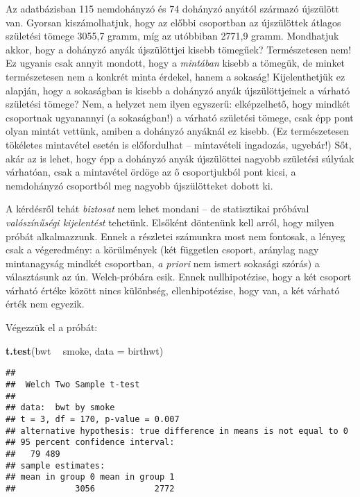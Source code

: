 \documentclass[]{book}
\newenvironment{Shaded}{\begin{snugshade}}{\end{snugshade}}
\newcommand{\DataTypeTok}[1]{\textcolor[rgb]{0.13,0.29,0.53}{#1}}
\newcommand{\KeywordTok}[1]{\textcolor[rgb]{0.13,0.29,0.53}{\textbf{#1}}}
\newcommand{\NormalTok}[1]{#1}
\newcommand{\OperatorTok}[1]{\textcolor[rgb]{0.81,0.36,0.00}{\textbf{#1}}}
\newcommand{\StringTok}[1]{\textcolor[rgb]{0.31,0.60,0.02}{#1}}
\begin{document}
Az adatbázisban 115 nemdohányzó és 74 dohányzó anyától származó újszülött van. Gyorsan kiszámolhatjuk, hogy az előbbi csoportban az újszülöttek átlagos születési tömege 3055,7 gramm, míg az utóbbiban 2771,9 gramm. Mondhatjuk akkor, hogy a dohányzó anyák újszülöttjei kisebb tömegűek? Természetesen nem! Ez ugyanis csak annyit mondott, hogy a \emph{mintában} kisebb a tömegük, de minket természetesen nem a konkrét minta érdekel, hanem a sokaság! Kijelenthetjük ez alapján, hogy a sokaságban is kisebb a dohányzó anyák újszülöttjeinek a várható születési tömege? Nem, a helyzet nem ilyen egyszerű: elképzelhető, hogy mindkét csoportnak ugyanannyi (a sokaságban!) a várható születési tömege, csak épp pont olyan mintát vettünk, amiben a dohányzó anyáknál ez kisebb. (Ez természetesen tökéletes mintavétel esetén is előfordulhat -- mintavételi ingadozás, ugyebár!) Sőt, akár az is lehet, hogy épp a dohányzó anyák újszülöttei nagyobb születési súlyúak várhatóan, csak a mintavétel ördöge az ő csoportjukból pont kicsi, a nemdohányzó csoportból meg nagyobb újszülötteket dobott ki.

A kérdésről tehát \emph{biztosat} nem lehet mondani -- de statisztikai próbával \emph{valószínűségi kijelentést} tehetünk. Elsőként döntenünk kell arról, hogy milyen próbát alkalmazzunk. Ennek a részletei számunkra most nem fontosak, a lényeg csak a végeredmény: a körülmények (két független csoport, aránylag nagy mintanagyság mindkét csoportban, \emph{a priori} nem ismert sokasági szórás) a választásunk az ún. Welch-próbára esik. Ennek nullhipotézise, hogy a két csoport várható értéke között nincs különbség, ellenhipotézise, hogy van, a két várható érték nem egyezik.

Végezzük el a próbát:

\begin{Shaded}
\begin{Highlighting}[]
\KeywordTok{t.test}\NormalTok{(bwt }\OperatorTok{~}\StringTok{ }\NormalTok{smoke, }\DataTypeTok{data =}\NormalTok{ birthwt)}
\end{Highlighting}
\end{Shaded}

\begin{verbatim}
## 
##  Welch Two Sample t-test
## 
## data:  bwt by smoke
## t = 3, df = 170, p-value = 0.007
## alternative hypothesis: true difference in means is not equal to 0
## 95 percent confidence interval:
##   79 489
## sample estimates:
## mean in group 0 mean in group 1 
##            3056            2772
\end{verbatim}
\end{document}
